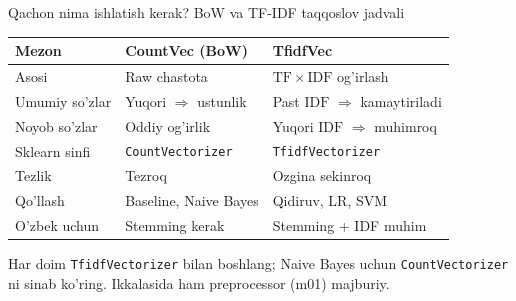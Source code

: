 \documentclass[aspectratio=169,11pt]{beamer}
\begin{document}
\begin{frame}{Qachon nima ishlatish kerak? BoW va TF-IDF taqqoslov jadvali}
  \begin{center}\small
  \begin{tabular}{p{2.8cm}p{4.2cm}p{4.2cm}}
    \toprule
    \textbf{Mezon} & \textbf{CountVec (BoW)} & \textbf{TfidfVec} \\
    \midrule
    Asosi & Raw chastota & $\mathrm{TF} \times \mathrm{IDF}$ og'irlash \\
    Umumiy so'zlar & Yuqori $\Rightarrow$ ustunlik & Past $\mathrm{IDF}$ $\Rightarrow$ kamaytiriladi \\
    Noyob so'zlar & Oddiy og'irlik & Yuqori $\mathrm{IDF}$ $\Rightarrow$ muhimroq \\
    Sklearn sinfi & \texttt{CountVectorizer} & \texttt{TfidfVectorizer} \\
    Tezlik & Tezroq & Ozgina sekinroq \\
    Qo'llash & Baseline, Naive Bayes & Qidiruv, LR, SVM \\
    O'zbek uchun & Stemming kerak & Stemming + IDF muhim \\
    \bottomrule
  \end{tabular}
  \end{center}
  \vspace{4pt}
  \begin{tcolorbox}[okbox,title=Amaliy qoida,top=2pt,bottom=2pt]
    \footnotesize
    Har doim \texttt{TfidfVectorizer} bilan boshlang;
    Naive Bayes uchun \texttt{CountVectorizer} ni sinab ko'ring.
    Ikkalasida ham preprocessor (m01) majburiy.
  \end{tcolorbox}
\end{frame}
\end{document}
